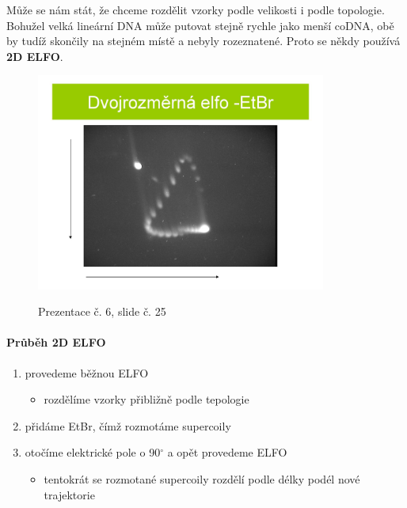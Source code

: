\documentclass[DIV=8]{scrreprt}
\begin{document}
Může se nám stát, že chceme rozdělit vzorky podle velikosti i podle topologie. Bohužel velká lineární DNA může putovat stejně rychle jako menší coDNA, obě by tudíž skončily na stejném místě a nebyly rozeznatené. Proto se někdy používá \textbf{2D ELFO}.

\begin{figure}
    \caption{Prezentace č. 6, slide č. 25}
    \includegraphics[width=0.85\textwidth]{slides-6/slide-25.jpg}
    \centering
    \label{slides-6-slide-25}
\end{figure}

\paragraph{Průběh 2D ELFO}
\begin{enumerate}[nosep]
    \item provedeme běžnou ELFO
\begin{itemize}[nosep]
    \item rozdělíme vzorky přibližně podle tepologie
\end{itemize}

    \item přidáme EtBr, čímž rozmotáme supercoily
    \item otočíme elektrické pole o 90\(^{\circ}\) a opět provedeme ELFO
\begin{itemize}[nosep]
    \item tentokrát se rozmotané supercoily rozdělí podle délky podél nové trajektorie
\end{itemize}

\end{enumerate}
\end{document}
